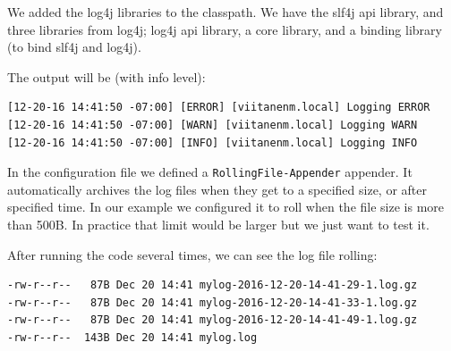 We added the log4j libraries to the classpath. We have the slf4j api library, and three libraries from log4j; log4j api library, a core library, and a binding library (to bind slf4j and log4j). 

The output will be (with info level):
\begin{lstlisting}
[12-20-16 14:41:50 -07:00] [ERROR] [viitanenm.local] Logging ERROR
[12-20-16 14:41:50 -07:00] [WARN] [viitanenm.local] Logging WARN
[12-20-16 14:41:50 -07:00] [INFO] [viitanenm.local] Logging INFO
\end{lstlisting}

In the configuration file we defined a \texttt{RollingFile\hyp{}Appender} appender. It automatically archives the log files when they get to a specified size, or after specified time. In our example we configured it to roll when the file size is more than 500B. In practice that limit would be larger but we just want to test it.

After running the code several times, we can see the log file rolling:
\begin{lstlisting}
-rw-r--r--   87B Dec 20 14:41 mylog-2016-12-20-14-41-29-1.log.gz
-rw-r--r--   87B Dec 20 14:41 mylog-2016-12-20-14-41-33-1.log.gz
-rw-r--r--   87B Dec 20 14:41 mylog-2016-12-20-14-41-49-1.log.gz
-rw-r--r--  143B Dec 20 14:41 mylog.log
\end{lstlisting}
